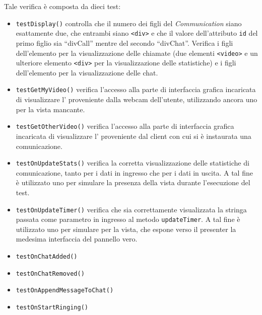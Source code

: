 \begin{itemize}
Tale verifica è composta da dieci test:
\begin{itemize}

\item \texttt{testDisplay()} controlla che il numero dei figli del \textit{Communication} siano esattamente due, che entrambi siano \texttt{<div>} e che il valore dell'attributo \texttt{id} del primo figlio sia ``divCall'' mentre del secondo ``divChat''. Verifica i figli dell'elemento per la visualizzazione delle chiamate (due elementi \texttt{<video>} e un ulteriore elemento \texttt{<div>} per la visualizzazione delle statistiche) e i figli dell'elemento per la visualizzazione delle chat.

\item \texttt{testGetMyVideo()} verifica l'accesso alla parte di interfaccia grafica incaricata di visualizzare l' proveniente dalla webcam dell'utente, utilizzando ancora uno  per la vista mancante.

\item \texttt{testGetOtherVideo()} verifica l'accesso alla parte di interfaccia grafica incaricata di visualizzare l' proveniente dal client con cui si è instaurata una comunicazione.

\item \texttt{testOnUpdateStats()} verifica la corretta visualizzazione delle statistiche di comunicazione, tanto per i dati in ingresso che per i dati in uscita. A tal fine è utilizzato uno  per simulare la presenza della vista durante l'esecuzione del test.

\item \texttt{testOnUpdateTimer()} verifica che sia correttamente visualizzata la stringa passata come parametro in ingresso al metodo \texttt{updateTimer}. A tal fine è utilizzato uno  per simulare per la vista, che espone verso il presenter la medesima interfaccia del pannello vero.

\item \texttt{testOnChatAdded()}

\item \texttt{testOnChatRemoved()}

\item \texttt{testOnAppendMessageToChat()}

\item \texttt{testOnStartRinging()}


\end{itemize}
\end{itemize}
